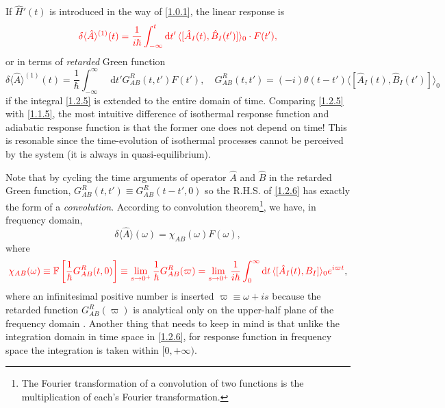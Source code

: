 \documentclass[10pt,nofootinbib,letterpaper]{revtex4}
\newcommand*\dd{\mathop{}\!\mathrm{d}}
\newcounter{Note}[section]
\newenvironment{Note}[1][]{{\par\normalfont\bfseries \underline{Note~\stepcounter{Note}\arabic{Note}.}~#1~~}}{\par}
\begin{document}
		If $\hat H'(t)$ is introduced in the way of \eqref{1.0.1}, the linear response is
		\begin{equation}\label{1.2.5}
			{\color{red}\delta \langle\hat A\rangle^{(1)}(t)=\dfrac{1}{i\hbar}\int_{-\infty}^t\dd t'\,\langle[\hat A_I(t),\hat B_I(t')]\rangle_0\cdot F(t'),}
		\end{equation}
		or in terms of \emph{retarded} Green function
		\begin{equation}\label{1.2.6}
			\delta \langle\hat A\rangle^{(1)}(t)=\dfrac{1}{\hbar}\int_{-\infty}^\infty\dd t' G_{AB}^R(t,t')F(t'),\quad G_{AB}^R(t,t')=(-i)\theta(t-t')\langle[\hat A_I(t),\hat B_I(t')]\rangle_0
		\end{equation}
		if the integral \eqref{1.2.5} is extended to the entire domain of time. 
		\begin{Note}
			Comparing \eqref{1.2.5} with \eqref{1.1.5}, the most intuitive difference of isothermal response function and adiabatic response function is that the former one does not depend on time! This is resonable since the time-evolution of isothermal processes cannot be perceived by the system (it is always in quasi-equilibrium). 
		\end{Note}
		\hfill\par
		Note that by cycling the time arguments of operator $\hat A$ and $\hat B$ in the retarded Green function, $G_{AB}^R(t,t')\equiv G^R_{AB}(t-t',0)$ so the R.H.S. of \eqref{1.2.6} has exactly the form of a \emph{convolution}. According to convolution theorem\footnote{The Fourier transformation of a convolution of two functions is the multiplication of each's Fourier transformation.}, we have, in frequency domain,
		\begin{equation}\label{1.2.7}
			\delta\langle\hat A\rangle(\omega)=\chi_{AB}(\omega)F(\omega),
		\end{equation}
		where
		\begin{equation}\label{1.2.8}
			 {\color{red}\chi_{AB}(\omega)\equiv\mathbb{F}\left[\dfrac{1}{\hbar}G_{AB}^R(t,0)\right]\equiv\lim_{s \rightarrow0^+}\dfrac{1}{\hbar}G_{AB}^R(\varpi)=\lim_{s\rightarrow0^+}\dfrac{1}{i\hbar}\int_0^\infty\dd t\,\langle[\hat A_I(t),B_I]\rangle_0 e^{i\varpi t}},
		\end{equation}
		where an infinitesimal positive number is inserted $\varpi\equiv\omega+is$ because the retarded function $G_{AB}^R(\varpi)$ is analytical only on the upper-half plane of the frequency domain \cite{abrikosov2012methods}. Another thing that needs to keep in mind is that unlike the integration domain in time space in \eqref{1.2.6}, for response function in frequency space the integration is taken within $[0,+\infty)$.\par
\end{document}
